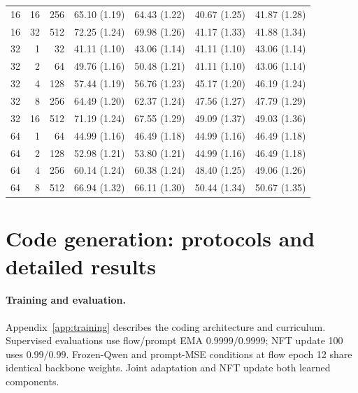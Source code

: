 \documentclass[11pt,letterpaper]{article}
\begin{document}
\begin{table}[p]
\begin{tabular}{@{}rrr rrrr@{}}
16 & 16 & 256 & 65.10 {\scriptsize (1.19)} & 64.43 {\scriptsize (1.22)} & 40.67 {\scriptsize (1.25)} & 41.87 {\scriptsize (1.28)} \\
16 & 32 & 512 & 72.25 {\scriptsize (1.24)} & 69.98 {\scriptsize (1.26)} & 41.17 {\scriptsize (1.33)} & 41.88 {\scriptsize (1.34)} \\
\midrule
32 & 1 & 32 & 41.11 {\scriptsize (1.10)} & 43.06 {\scriptsize (1.14)} & 41.11 {\scriptsize (1.10)} & 43.06 {\scriptsize (1.14)} \\
32 & 2 & 64 & 49.76 {\scriptsize (1.16)} & 50.48 {\scriptsize (1.21)} & 41.11 {\scriptsize (1.10)} & 43.06 {\scriptsize (1.14)} \\
32 & 4 & 128 & 57.44 {\scriptsize (1.19)} & 56.76 {\scriptsize (1.23)} & 45.17 {\scriptsize (1.20)} & 46.19 {\scriptsize (1.24)} \\
32 & 8 & 256 & 64.49 {\scriptsize (1.20)} & 62.37 {\scriptsize (1.24)} & 47.56 {\scriptsize (1.27)} & 47.79 {\scriptsize (1.29)} \\
32 & 16 & 512 & 71.19 {\scriptsize (1.24)} & 67.55 {\scriptsize (1.29)} & 49.09 {\scriptsize (1.37)} & 49.03 {\scriptsize (1.36)} \\
\midrule
64 & 1 & 64 & 44.99 {\scriptsize (1.16)} & 46.49 {\scriptsize (1.18)} & 44.99 {\scriptsize (1.16)} & 46.49 {\scriptsize (1.18)} \\
64 & 2 & 128 & 52.98 {\scriptsize (1.21)} & 53.80 {\scriptsize (1.21)} & 44.99 {\scriptsize (1.16)} & 46.49 {\scriptsize (1.18)} \\
64 & 4 & 256 & 60.14 {\scriptsize (1.24)} & 60.38 {\scriptsize (1.24)} & 48.40 {\scriptsize (1.25)} & 49.06 {\scriptsize (1.26)} \\
64 & 8 & 512 & 66.94 {\scriptsize (1.32)} & 66.11 {\scriptsize (1.30)} & 50.44 {\scriptsize (1.34)} & 50.67 {\scriptsize (1.35)} \\
\bottomrule
\end{tabular}
\end{table}

\FloatBarrier

\section{Code generation: protocols and detailed results}
\label{app:codingdetails}

\paragraph{Training and evaluation.}
Appendix~\ref{app:training} describes the coding architecture and curriculum. Supervised evaluations use flow/prompt EMA $0.9999/0.9999$; NFT update 100 uses $0.99/0.99$. Frozen-Qwen and prompt-MSE conditions at flow epoch 12 share identical backbone weights. Joint adaptation and NFT update both learned components.
\end{document}
